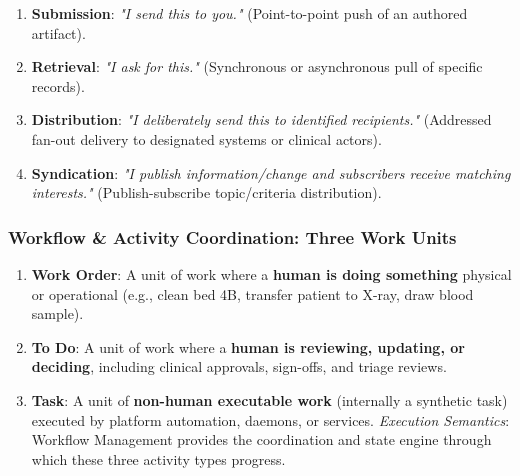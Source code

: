 \begin{enumerate}

\item 
\textbf{Submission}: \emph{"I send this to you."} (Point-to-point push of an authored artifact).



\item 
\textbf{Retrieval}: \emph{"I ask for this."} (Synchronous or asynchronous pull of specific records).



\item 
\textbf{Distribution}: \emph{"I deliberately send this to identified recipients."} (Addressed fan-out delivery to designated systems or clinical actors).



\item 
\textbf{Syndication}: \emph{"I publish information/\allowbreak{}change and subscribers receive matching interests."} (Publish-subscribe topic/\allowbreak{}criteria distribution).



\end{enumerate}
\label{rad:enabling:587}
\subsubsection*{Workflow \& Activity Coordination: Three Work Units}
\label{rad:enabling:588}

\begin{enumerate}

\item 
\textbf{Work Order}: A unit of work where a \textbf{human is doing something} physical or operational (e.g., clean bed 4B, transfer patient to X-ray, draw blood sample).



\item 
\textbf{To Do}: A unit of work where a \textbf{human is reviewing, updating, or deciding}, including clinical approvals, sign-offs, and triage reviews.



\item 
\textbf{Task}: A unit of \textbf{non-human executable work} (internally a synthetic task) executed by platform automation, daemons, or services. \emph{Execution Semantics}: Workflow Management provides the coordination and state engine through which these three activity types progress.



\end{enumerate}
\label{rad:enabling:593}
